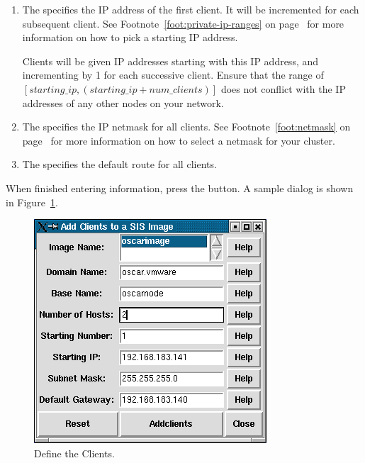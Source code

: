 \begin{enumerate}
\item The  specifies the IP address of the first
  client. It will be incremented for each subsequent client.  See
  Footnote~\ref{foot:private-ip-ranges} on
  page~\pageref{foot:private-ip-ranges} for more information on how to
  pick a starting IP address.

  Clients will be given IP addresses starting with this IP address,
  and incrementing by 1 for each successive client.  Ensure that the
  range of $[ starting\_ip, (starting\_ip + num\_clients) ]$ does not
  conflict with the IP addresses of any other nodes on your network.
  
\item The  specifies the IP netmask for all
  clients.  See Footnote~\ref{foot:netmask} on
  page~\pageref{foot:netmask} for more information on how to select a
  netmask for your cluster.
  
\item The  specifies the default route for all
  clients.

\end{enumerate}
  
When finished entering information, press the  button.
A sample dialog is shown in Figure~\ref{fig:detailed-define-clients}. 

\begin{figure}[htbp]
  \begin{center}
    \includegraphics[scale=\imgscale]{figs/5a_sbs-define-clients1}
    \caption{Define the Clients.}
    \label{fig:detailed-define-clients}
  \end{center}
\end{figure}

